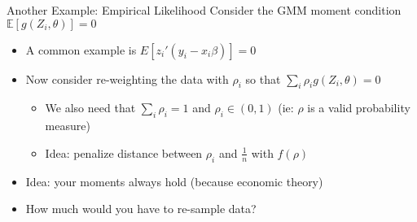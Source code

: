 
\begin{frame}{Another Example: Empirical Likelihood}
Consider the GMM moment condition $\mathbb{E}[g(Z_i,\theta)]=0$
\begin{itemize}
\item A common example is $E[z_i' (y_i-x_i \beta)]=0$
\item Now consider re-weighting the data with $\rho_i$ so that $\sum_i \rho_i g(Z_i,\theta)=0$
\begin{itemize}
\item We also need that $\sum_i \rho_i =1$ and $\rho_i \in (0,1)$ (ie: $\rho$ is a valid probability measure)
\item Idea: penalize distance between $\rho_i$ and $\frac{1}{n}$ with $f(\rho)$
\end{itemize}
\item Idea: your moments always hold (because economic theory)
\item How much would you have to re-sample data?
\end{itemize}
\end{frame}



